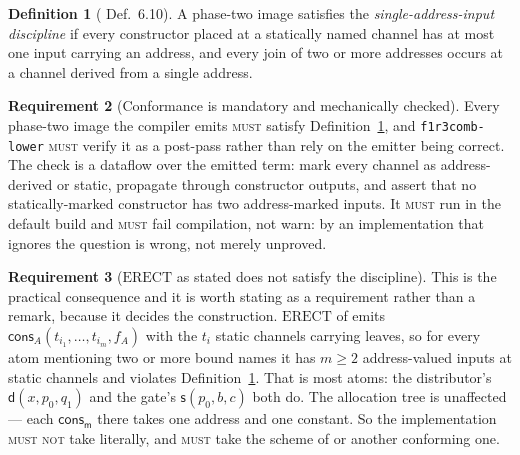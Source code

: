 \documentclass[11pt,a4paper]{article}
\newcommand{\code}[1]{\texttt{#1}}
\newcommand{\MUST}{\textsc{must}}
\newcommand{\MUSTNOT}{\textsc{must not}}
\newcommand{\mm}{\mathsf{m}}
\newcommand{\dd}{\mathsf{d}}
\newcommand{\sy}{\mathsf{s}}
\newcommand{\cons}{\mathsf{cons}}
\newcommand{\ERECT}{\mathrm{ERECT}}
\theoremstyle{definition}
\newtheorem{definition}{Definition}[section]
\newtheorem{requirement}[definition]{Requirement}
\theoremstyle{plain}
\begin{document}
\begin{definition}[\cite{draft3} Def.~6.10]\label{def:sai}
A phase-two image satisfies the \emph{single-address-input discipline} if
every constructor placed at a statically named channel has at most one input
carrying an address, and every join of two or more addresses occurs at a
channel derived from a single address.
\end{definition}

\begin{requirement}[Conformance is mandatory and mechanically checked]
\label{req:sai}
Every phase-two image the compiler emits \MUST{} satisfy
Definition~\ref{def:sai}, and \code{f1r3comb-lower} \MUST{} verify it as a
post-pass rather than rely on the emitter being correct. The check is a
dataflow over the emitted term: mark every channel as address-derived or
static, propagate through constructor outputs, and assert that no
statically-marked constructor has two address-marked inputs. It \MUST{} run in
the default build and \MUST{} fail compilation, not warn: by
\cite[Rem.~6.12]{draft3} an implementation that ignores the question is wrong,
not merely unproved.
\end{requirement}

\begin{requirement}[$\ERECT$ as stated does not satisfy the discipline]
\label{req:erectviolates}
This is the practical consequence and it is worth stating as a requirement
rather than a remark, because it decides the construction. $\ERECT$ of
\cite[Def.~6.8]{draft3} emits
$\cons_{A}(t_{i_{1}},\dots,t_{i_{m}},f_{A})$ with the $t_{i}$ static channels
carrying leaves, so for every atom mentioning two or more bound names it has
$m \geq 2$ address-valued inputs at static channels and violates
Definition~\ref{def:sai}. That is most atoms: the distributor's
$\dd(x,p_{0},q_{1})$ and the gate's $\sy(p_{0},b,c)$ both do. The allocation
tree is unaffected --- each $\cons_{\mm}$ there takes one address and one
constant. So the implementation \MUSTNOT{} take \cite[Def.~6.8]{draft3}
literally, and \MUST{} take the scheme of \cite[Rem.~6.12]{draft3} or another
conforming one.
\end{requirement}
\end{document}
